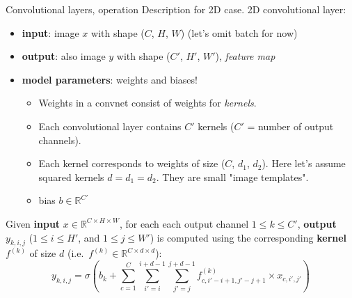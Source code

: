 \begin{frame}{Convolutional layers, operation}
Description for 2D case. 2D convolutional layer:
\vsp
\begin{itemize}
\item \textbf{input}: image $x$ with shape ($C$, $H$, $W$) (let's omit batch for now)
\item  \textbf{output}: also image $y$ with shape ($C'$, $H'$, $W'$), \textit{feature map}
\item \textbf{model parameters}: weights and biases!
\begin{itemize}
\item Weights in a convnet consist of weights for \textit{kernels}.
\item Each convolutional layer contains $C'$ kernels ($C'$ = number of output channels).
\item Each kernel corresponds to weights of size ($C$, $d_{1}$, $d_{2}$). Here let's assume squared kernels $d=d_1=d_2$. They are small "image templates".
\item bias $b \in \mathbb{R}^{C'}$ 
\end{itemize}
\end{itemize}
\vsp
\vsp
\pause
 Given \textbf{input} $x \in \mathbb{R}^{C \times H \times W}$, for each each output channel $ 1 \leq k \leq C'$, \textbf{output} $y_{k, i, j}$ ($ 1 \leq i \leq H'$, and $ 1 \leq j \leq W'$) is computed using the corresponding \textbf{kernel} $f^{(k)}$ of size $d$ (i.e.\, $f^{(k)} \in \mathbb{R}^{C \times d \times d}$):
\[
y_{k, i, j} =  \sigma\left(b_{k} + \sum_{c=1}^{C} \sum_{i'=i}^{i+d-1} \sum_{j'=j}^{j+d-1} f^{(k)}_{c, i'-i+1, j'-j+1} \times x_{c, i', j'}\right)
\]
\end{frame}


